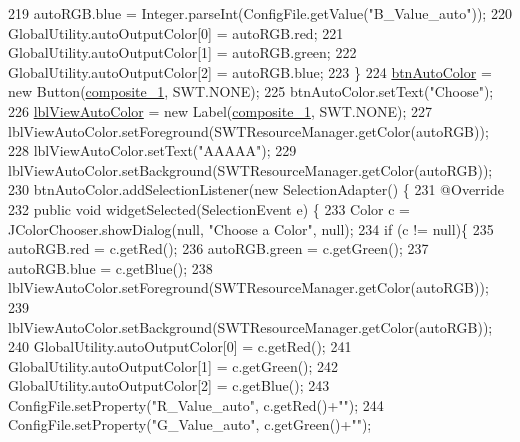 \begin{DoxyCode}
219             autoRGB.blue = Integer.parseInt(ConfigFile.getValue(\textcolor{stringliteral}{"B\_Value\_auto"}));       
220             GlobalUtility.autoOutputColor[0] = autoRGB.red;
221             GlobalUtility.autoOutputColor[1] = autoRGB.green;
222             GlobalUtility.autoOutputColor[2] = autoRGB.blue;
223         \}
224         \hyperlink{classit_1_1isislab_1_1masonhelperdocumentation_1_1mason_1_1wizards_1_1_b___project_information_page_a60a4bbca5d0ee37acbc02b31f69db1bd}{btnAutoColor} = \textcolor{keyword}{new} Button(\hyperlink{classit_1_1isislab_1_1masonhelperdocumentation_1_1mason_1_1wizards_1_1_b___project_information_page_ad2438c6d59f23f0717a1503f4e823bb8}{composite\_1}, SWT.NONE);
225         btnAutoColor.setText(\textcolor{stringliteral}{"Choose"});
226         \hyperlink{classit_1_1isislab_1_1masonhelperdocumentation_1_1mason_1_1wizards_1_1_b___project_information_page_a649e641abf9319f5db69ccf3333fbf41}{lblViewAutoColor} = \textcolor{keyword}{new} Label(\hyperlink{classit_1_1isislab_1_1masonhelperdocumentation_1_1mason_1_1wizards_1_1_b___project_information_page_ad2438c6d59f23f0717a1503f4e823bb8}{composite\_1}, SWT.NONE);
227         lblViewAutoColor.setForeground(SWTResourceManager.getColor(autoRGB));
228         lblViewAutoColor.setText(\textcolor{stringliteral}{"AAAAA"});
229         lblViewAutoColor.setBackground(SWTResourceManager.getColor(autoRGB));
230         btnAutoColor.addSelectionListener(\textcolor{keyword}{new} SelectionAdapter() \{
231             @Override
232             \textcolor{keyword}{public} \textcolor{keywordtype}{void} widgetSelected(SelectionEvent e) \{
233                 Color c = JColorChooser.showDialog(null, \textcolor{stringliteral}{"Choose a Color"}, null);
234                   \textcolor{keywordflow}{if} (c != null)\{
235                       autoRGB.red = c.getRed();
236                       autoRGB.green = c.getGreen();
237                       autoRGB.blue = c.getBlue();
238                       lblViewAutoColor.setForeground(SWTResourceManager.getColor(autoRGB));
239                       lblViewAutoColor.setBackground(SWTResourceManager.getColor(autoRGB));
240                       GlobalUtility.autoOutputColor[0] = c.getRed();
241                       GlobalUtility.autoOutputColor[1] = c.getGreen();
242                       GlobalUtility.autoOutputColor[2] = c.getBlue();
243                       ConfigFile.setProperty(\textcolor{stringliteral}{"R\_Value\_auto"}, c.getRed()+\textcolor{stringliteral}{""});
244                       ConfigFile.setProperty(\textcolor{stringliteral}{"G\_Value\_auto"}, c.getGreen()+\textcolor{stringliteral}{""});

\end{DoxyCode}

